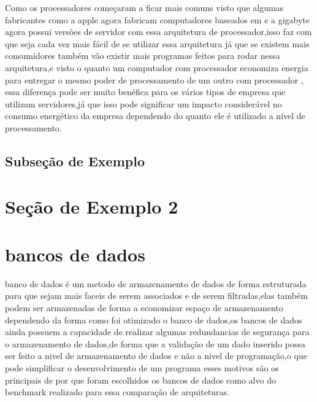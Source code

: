\documentclass[
	12pt,				%
	openright,			%
	oneside,			%
	a4paper,			%
	english,			%
	french,				%
	spanish,			%
	brazil,				%
	]{abntex2}
\begin{document}
Como os processadores  começaram a ficar mais comuns visto que algumas fabricantes como a apple agora fabricam computadores baseados em  e a gigabyte agora possui versões de servidor com essa arquitetura de processador,isso faz com que seja cada vez mais fácil de se utilizar essa arquitetura já que se existem mais consumidores também vão existir mais programas feitos para rodar nessa arquitetura,e visto o quanto um computador com processador  economiza energia para entregar o mesmo poder de processamento de um outro com processador  , essa diferença pode ser muito benéfica para os vários tipos de empresa que utilizam servidores,já que isso pode significar um impacto considerável no consumo energético da empresa dependendo do quanto ele é utilizado a nível de processamento.\newline

\subsection{Subseção de Exemplo}



\section{Seção de Exemplo 2}
\label{sec: exemplo2}

\section{bancos de dados}
\label{sec: bancos de dados}
banco de dados é um metodo de armazenamento de dados de forma estruturada para que sejam mais faceis de serem associados e de serem filtradas,elas também podem ser armazenadas de forma a economizar espaço de armazenamento dependendo da forma como foi otimizado o banco de dados,os bancos de dados ainda possuem a capacidade de realizar algumas redundancias de segurança para o armazenamento de dados,de forma que a validação de um dado inserido possa ser feito a nivel de armazenamento de dados e não a nivel de programação,o que pode simplificar o desenvolvimento de um programa
esses motivos são os principais de por que foram escolhidos os bancos de dados como alvo do benchmark realizado para essa comparação de arquiteturas.
\end{document}
